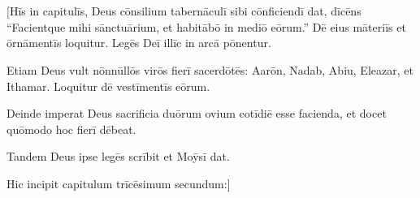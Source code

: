 \chapter{}


\vspace*{-1.4cm}
\thispagestyle{empty}

[Hīs in capitulīs, Deus cōnsilium tabernāculī sibi cōnficiendī dat, dīcēns ``Facientque mihi sānctuārium, et habitābō in mediō eōrum.'' Dē eius māteriīs et ōrnāmentīs loquitur. Legēs Deī illīc in arcā pōnentur.

Etiam Deus vult nōnnūllōs virōs fierī sacerdōtēs: Aarōn, Nadab, Abiu, Eleazar, et Ithamar. Loquitur dē vestīmentīs eōrum.

Deinde imperat Deus sacrificia duōrum ovium cotīdiē esse facienda, et docet quōmodo hoc fierī dēbeat.

Tandem Deus ipse legēs scrībit et Moȳsī dat.

Hic incipit capitulum trīcēsimum secundum:]


